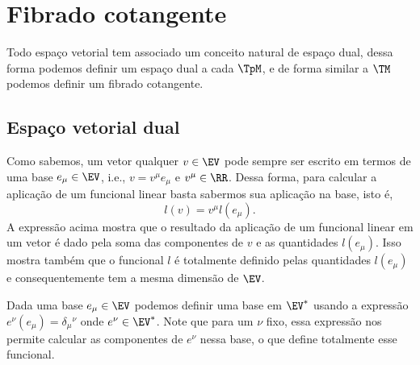 \section{Fibrado cotangente}

Todo espaço vetorial tem associado um conceito natural de espaço dual, dessa
forma podemos definir um espaço dual a cada $\TpM$, e de forma similar a $\TM$
podemos definir um fibrado cotangente.

\subsection{Espaço vetorial dual}


Como sabemos, um vetor qualquer $v\in\EV$ pode sempre ser escrito em termos de
uma base $e_\mu\in\EV$, i.e., $v = v^\mu e_\mu$ e $v^\mu\in\RR$. Dessa forma,
para calcular a aplicação de um funcional linear basta sabermos sua aplicação na
base, isto é,
\begin{equation}
	l(v) = v^\mu l(e_\mu).
\end{equation}
A expressão acima mostra que o resultado da aplicação de um funcional linear em
um vetor é dado pela soma das componentes de $v$ e as quantidades $l(e_\mu)$.
Isso mostra também que o funcional $l$ é totalmente definido pelas quantidades
$l(e_\mu)$ e consequentemente tem a mesma dimensão de $\EV$.

Dada uma base $e_\mu\in\EV$ podemos definir uma base em $\EV^*$ usando a
expressão  $e^\nu(e_\mu) = \delta_\mu{}^\nu$ onde $e^\nu\in\EV^*$. Note que para
um $\nu$ fixo, essa expressão nos permite calcular as componentes de $e^\nu$
nessa base, o que define totalmente esse funcional.


\listofexercises



